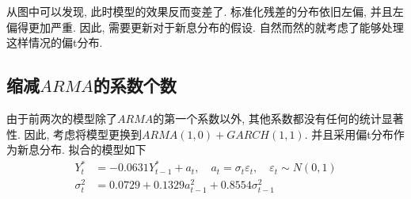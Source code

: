 \documentclass[11pt]{article}
\begin{document}
\qquad 从图中可以发现, 此时模型的效果反而变差了. 标准化残差的分布依旧左偏, 并且左偏得更加严重. 因此, 需要更新对于新息分布的假设. 自然而然的就考虑了能够处理这样情况的偏t分布.

\subsection{缩减$ARMA$的系数个数}
\qquad 由于前两次的模型除了$ARMA$的第一个系数以外, 其他系数都没有任何的统计显著性. 因此, 考虑将模型更换到$ARMA(1,0)+GARCH(1,1)$. 并且采用偏t分布作为新息分布. 拟合的模型如下
\begin{equation*}\begin{aligned}
    Y_{t}^{*} &=-0.0631 Y_{t-1}^{*}+a_{t}, \quad a_{t}=\sigma_{t} \varepsilon_{t}, \quad \varepsilon_{t} \sim N(0,1) \\
    \sigma_{t}^{2} &=0.0729+ 0.1329 a_{t-1}^{2}+ 0.8554 \sigma_{t-1}^{2}
\end{aligned}\end{equation*}
\end{document}

